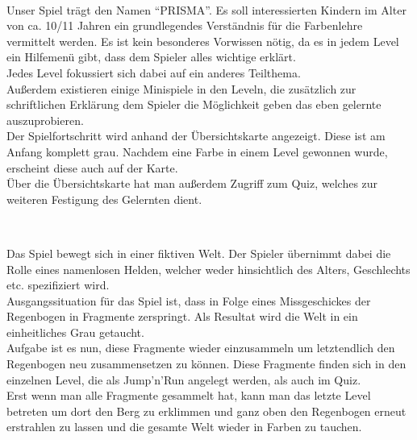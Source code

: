\documentclass[10pt,a4paper,notitlepage]{report}
\begin{document}
	\\\par\medskip\Text
	Unser Spiel trägt den Namen \enquote{PRISMA}. Es soll interessierten Kindern im Alter von ca. 10/11 Jahren ein grundlegendes Verständnis für die Farbenlehre vermittelt werden. Es ist kein besonderes Vorwissen nötig, da es in jedem Level ein Hilfemenü gibt, dass dem Spieler alles wichtige erklärt.\\
	Jedes Level fokussiert sich dabei auf ein anderes Teilthema.\\
	Außerdem existieren einige Minispiele in den Leveln, die zusätzlich zur schriftlichen Erklärung dem Spieler die Möglichkeit geben das eben gelernte auszuprobieren.\\
	Der Spielfortschritt wird anhand der Übersichtskarte angezeigt. Diese ist am Anfang komplett grau. Nachdem eine Farbe in einem Level gewonnen wurde, erscheint diese auch auf der Karte.\\
	Über die Übersichtskarte hat man außerdem Zugriff zum Quiz, welches zur weiteren Festigung des Gelernten dient.\\\par\smallskip
	
	\\\par\medskip\Text
	Das Spiel bewegt sich in einer fiktiven Welt. Der Spieler übernimmt dabei die Rolle eines namenlosen Helden, welcher weder hinsichtlich des Alters, Geschlechts etc. spezifiziert wird.\\
	Ausgangssituation für das Spiel ist, dass in Folge eines Missgeschickes der Regenbogen in Fragmente zerspringt. Als Resultat wird die Welt in ein einheitliches Grau getaucht.\\
	Aufgabe ist es nun, diese Fragmente wieder einzusammeln um letztendlich den	Regenbogen neu zusammensetzen zu können. Diese Fragmente finden sich in den einzelnen Level, die als Jump'n'Run angelegt werden, als auch im Quiz.\\
	Erst wenn man alle Fragmente gesammelt hat, kann man das letzte Level betreten um dort den Berg zu erklimmen und ganz oben den Regenbogen erneut erstrahlen zu lassen und die gesamte Welt wieder in Farben zu tauchen.\\\par\smallskip
	
\end{document}
